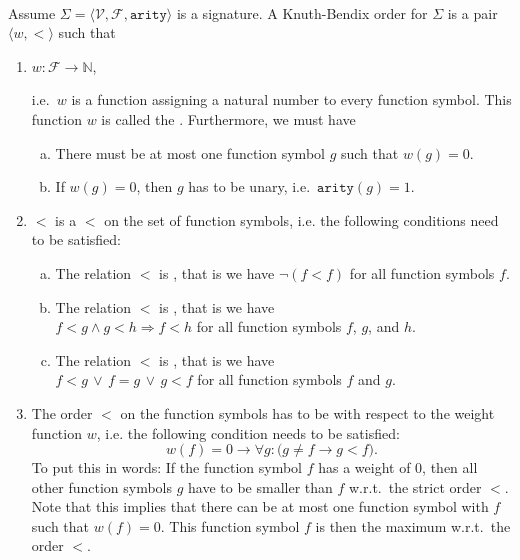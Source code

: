 \begin{Definition} \hspace*{\fill} \\
  Assume $\Sigma = \langle \mathcal{V}, \mathcal{F}, \mathtt{arity}\rangle$ is a signature.
  A Knuth-Bendix order for $\Sigma$ is a pair $\langle w, < \rangle$ such that
\begin{enumerate}
\item $w: \mathcal{F}\rightarrow \mathbb{N}$,

      i.e.~$w$ is a function assigning a natural number to every function symbol.
      This function $w$ is called the .  Furthermore, we must have
      \begin{enumerate}[(a)]
      \item There must be at most one function symbol $g$ such that $w(g) = 0$.
      \item If $w(g) = 0$, then $g$ has to be unary, i.e.~$\mathtt{arity}(g) = 1$.
      \end{enumerate}
\item $<$ is a  $<$ on the set of function symbols, i.e. the following
      conditions need to be satisfied:
      \begin{enumerate}[(a)]
      \item The relation $<$ is , that is we have $\neg (f < f)$ for all function symbols $f$.
      \item The relation $<$ is , that is we have 
            \\[0.2cm]
            \hspace*{1.3cm}
            $f < g \wedge g < h \Rightarrow f < h$ \quad for all function symbols $f$, $g$, and $h$.
      \item The relation $<$ is , that is we have 
            \\[0.2cm]
            \hspace*{1.3cm}
            $f < g \,\vee\, f = g \,\vee\, g < f$ \quad for all function symbols $f$ and $g$.
      \end{enumerate}
\item The order $<$ on the function symbols has to be  with respect to the weight function
      $w$, i.e. the following condition needs to be satisfied:
      $$ w(f) = 0 \rightarrow \forall g:  \bigl(g \not=f \rightarrow g < f\bigr). $$
      To put this in words: If the function symbol $f$ has a weight of $0$, then 
      all other function symbols $g$ have to be smaller than $f$ w.r.t.~the strict order $<$.
      Note that this implies that there can be at most one function symbol with $f$ such that $w(f) = 0$. 
      This function symbol $f$ is then the maximum w.r.t.~the order $<$. \eox
\end{enumerate}
\end{Definition} 

